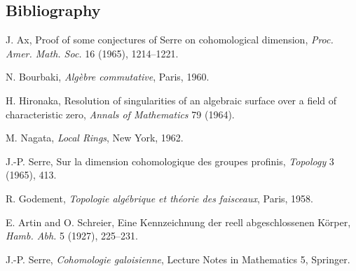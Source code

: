 \subsection*{Bibliography}
\begin{enumerate}[label={[\arabic*]}]
\item J. Ax, Proof of some conjectures of Serre on cohomological dimension, \emph{Proc. Amer. Math. Soc.} 16 (1965), 1214--1221.
\item N. Bourbaki, \emph{Alg\`ebre commutative}, Paris, 1960.
\item H. Hironaka, Resolution of singularities of an algebraic surface over a field of characteristic zero, \emph{Annals of Mathematics} 79 (1964).
\item M. Nagata, \emph{Local Rings}, New York, 1962.
\item J.-P. Serre, Sur la dimension cohomologique des groupes profinis, \emph{Topology} 3 (1965), 413.
\item R. Godement, \emph{Topologie alg\'ebrique et th\'eorie des faisceaux}, Paris, 1958.
\item E. Artin and O. Schreier, Eine Kennzeichnung der reell abgeschlossenen K\"orper, \emph{Hamb. Abh.} 5 (1927), 225--231.
\item J.-P. Serre, \emph{Cohomologie galoisienne}, Lecture Notes in Mathematics 5, Springer.
\end{enumerate}

